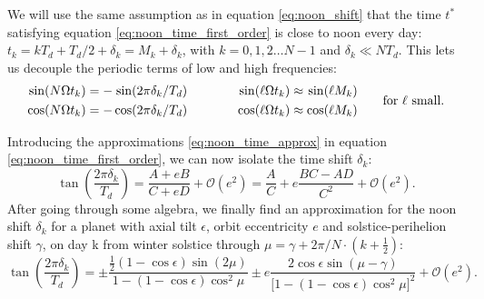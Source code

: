 \documentclass[12pt]{article}
\newcommand{\Sin}{%
  \mathop{\sbox0{$\cos$}\makebox[\wd0][r]{$\sin$}}%
}
\begin{document}
We will use the same assumption as in equation \eqref{eq:noon_shift} that the 
time $t^*$ satisfying equation \eqref{eq:noon_time_first_order} is close to 
noon every day: $t_k=kT_d + T_d/2 + \delta_k = M_k + \delta_k$, with 
$k=0,1,2\ldots N-1$ and $\delta_k \ll NT_d$. 
This lets us decouple the periodic terms of low and high frequencies:
\begin{equation}
    \begin{aligned}
        \Sin(N\Omega t_k) &= -\Sin(2\pi\delta_k / T_d)\\
        \cos(N\Omega t_k) &= -\cos(2\pi\delta_k / T_d)\\
    \end{aligned}
    \qquad\qquad
    \begin{aligned}
        \Sin(\ell\Omega t_k) & \approx \Sin(\ell M_k)\\
        \cos(\ell\Omega t_k) & \approx \cos(\ell M_k)
    \end{aligned}
    \qquad
    \text{for } \ell \text{ small}.
    \label{eq:noon_time_approx}
\end{equation}

Introducing the approximations \eqref{eq:noon_time_approx} in equation 
\eqref{eq:noon_time_first_order}, we can now isolate the time shift $\delta_k$:
\begin{equation}
    \tan(\frac{2\pi \delta_k}{T_d}) 
     = \frac{A+eB}{C+eD} + \mathcal{O}(e^2)
     = \frac{A}{C} + e \frac{B C - A D}{C^2} + \mathcal{O}(e^2).
\end{equation}
After going through some algebra, we finally find an approximation for 
the noon shift $\delta_k$ for a planet with axial tilt $\epsilon$, 
orbit eccentricity $e$ and solstice-perihelion shift $\gamma$, 
on day k from winter solstice through 
$\mu=\gamma + 2\pi/N \cdot (k+\tfrac{1}{2})$:
{\small
\begin{equation}
    \tan(\frac{2\pi \delta_k}{T_d})
    = \pm \frac{\tfrac{1}{2}(1-\cos\epsilon)\sin(2\mu)}{1-(1-\cos\epsilon)\cos^2\mu}
        \pm e \frac{2\cos\epsilon \sin(\mu-\gamma)}{\big[1-(1-\cos\epsilon)\cos^2\mu\big]^2}
    +\mathcal{O}(e^2).
\end{equation}
}
\end{document}
